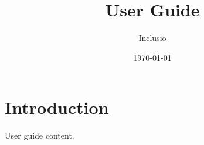 \documentclass[final,tagged]{pub-guide}
\title{User Guide}
\author{Inclusio}
\date{\today}
\begin{document}
\maketitle

\section{Introduction}
User guide content.
\end{document}
